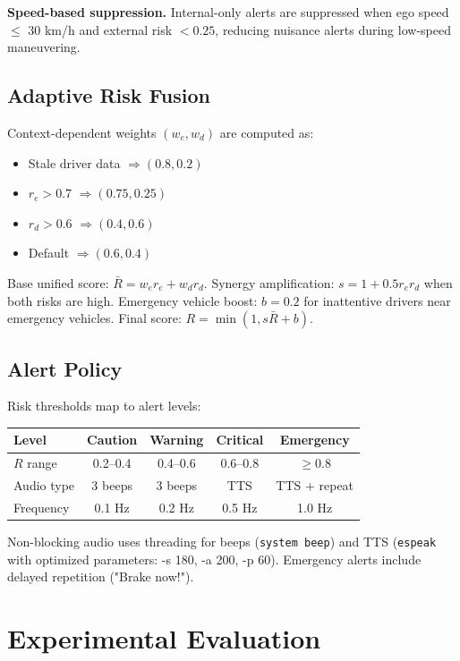 \textbf{Speed-based suppression.} Internal-only alerts are suppressed
when ego speed $\leq$ 30 km/h and external risk $< 0.25$, reducing
nuisance alerts during low-speed maneuvering.

\subsection{Adaptive Risk Fusion}
Context-dependent weights $(w_e, w_d)$ are computed as:
\begin{itemize}[leftmargin=*]
\item Stale driver data $\Rightarrow (0.8, 0.2)$
\item $r_e > 0.7$ $\Rightarrow (0.75, 0.25)$
\item $r_d > 0.6$ $\Rightarrow (0.4, 0.6)$
\item Default $\Rightarrow (0.6, 0.4)$
\end{itemize}

Base unified score: $\bar{R} = w_e r_e + w_d r_d$.
Synergy amplification: $s = 1 + 0.5 r_e r_d$ when both risks are high.
Emergency vehicle boost: $b = 0.2$ for inattentive drivers near emergency vehicles.
Final score: $R = \min(1, s\bar{R} + b)$.

\subsection{Alert Policy}
Risk thresholds map to alert levels:

\begin{center}
\small
\begin{tabular}{lcccc}
\toprule
Level & Caution & Warning & Critical & Emergency \\ \midrule
$R$ range & 0.2–0.4 & 0.4–0.6 & 0.6–0.8 & $\geq 0.8$ \\
Audio type & 3 beeps & 3 beeps & TTS & TTS + repeat \\
Frequency & 0.1 Hz & 0.2 Hz & 0.5 Hz & 1.0 Hz \\ \bottomrule
\end{tabular}
\end{center}

Non-blocking audio uses threading for beeps (\texttt{system beep}) 
and TTS (\texttt{espeak} with optimized parameters: -s 180, -a 200, -p 60).
Emergency alerts include delayed repetition ("Brake now!").

\section{Experimental Evaluation}

